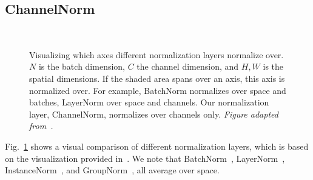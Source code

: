 \begin{subappendices}
\section{ChannelNorm} \label{hific:sec:channelnormdetails}

\begin{figure}[ht]
\small
{}  %
%
\quad %
%
\quad %
%
\quad %
%
\quad %
 \\
\caption{\label{hific:fig:normlayers}Visualizing which axes different normalization layers normalize over. $N$ is the batch dimension, $C$ the channel dimension, and $H,W$ is the spatial dimensions. If the shaded area spans over an axis, this axis is normalized over. For example, BatchNorm normalizes over space and batches, LayerNorm over space and channels. Our normalization layer, ChannelNorm, normalizes over channels only. \emph{Figure adapted from~\cite{wu2018group}.}}
\end{figure}

Fig.~\ref{hific:fig:normlayers} shows a visual comparison of different normalization layers, which is based on the visualization provided in~\cite{wu2018group}.
We note that 
BatchNorm~\cite{ioffe2015batch}, LayerNorm~\cite{ba2016layer}, InstanceNorm~\cite{ulyanov2016instance}, and GroupNorm~\cite{wu2018group}, all average over space.


\end{subappendices}
